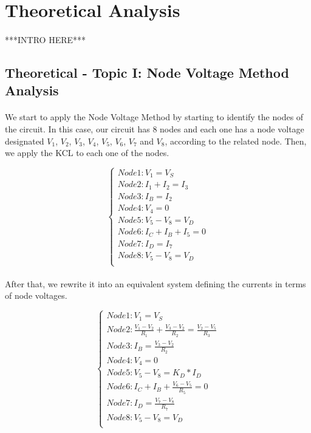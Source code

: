 \section{Theoretical Analysis}
\label{sec:analysis}

\paragraph{}
***INTRO HERE***


\subsection{Theoretical - Topic I: Node Voltage Method Analysis}
\label{subsec:first_topic}

\paragraph{}
We start to apply the Node Voltage Method by starting to identify the nodes of the circuit. In this case, our circuit has 8 nodes and each one has a node voltage designated $V_1$, $V_2$, $V_3$, $V_4$, $V_5$, $V_6$, $V_7$ and $V_8$, according to the related node. Then, we apply the KCL to each one of the nodes.

\[
\left\{\begin{matrix}
Node 1: V_1 = V_S\\
Node 2: I_1 + I_2 = I_3\\
Node 3: I_B = I_2\\
Node 4: V_4 = 0\\
Node 5: V_5 -V_8 = V_D\\
Node 6: I_C + I_B + I_5 = 0\\
Node 7: I_D = I_7\\
Node 8: V_5 -V_8 = V_D\\
\end{matrix}\right.
\]

\paragraph{}
After that, we rewrite it into an equivalent system defining the currents in terms of node voltages.

\[
\left\{\begin{matrix}
Node 1: V_1 = V_S\\
Node 2: \frac{V_1-V_2}{R_1} + \frac{V_3-V_2}{R_2} = \frac{V_2-V_5}{R_3}\\
Node 3: I_B = \frac{V_3-V_2}{R_2}\\
Node 4: V_4 = 0\\
Node 5: V_5 -V_8 = K_D*I_D\\
Node 6: I_C + I_B + \frac{V_6-V_5}{R_5} = 0\\
Node 7: I_D = \frac{V_7-V_8}{R_7}\\
Node 8: V_5 -V_8 = V_D\\
\end{matrix}\right.
\]

